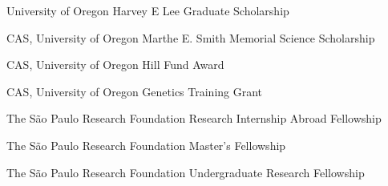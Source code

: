 {%
	University of Oregon}
{%
	Harvey E Lee Graduate Scholarship
}
{}

{%
	CAS, University of Oregon}
{%
	Marthe E. Smith Memorial Science Scholarship}
{}

{%
	CAS, University of Oregon}
{%
	Hill Fund Award}
{}

{%
	CAS, University of Oregon}
{%
	Genetics Training Grant}
{}

{%
	The São Paulo Research Foundation}
{%
	Research Internship Abroad Fellowship}
{}

{%
	The São Paulo Research Foundation}
{%
	Master's Fellowship}
{}

{%
	The São Paulo Research Foundation}
{%
	Undergraduate Research Fellowship}
{}
